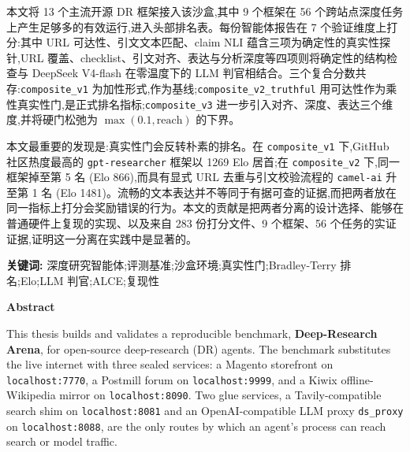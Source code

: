 \documentclass[UTF8,a4paper,12pt,oneside]{ctexart}
\begin{document}
本文将 13 个主流开源 DR 框架接入该沙盒,其中 9 个框架在 56 个跨站点深度任务上产生足够多的有效运行,进入头部排名表。每份智能体报告在 7 个验证维度上打分:其中 URL 可达性、引文文本匹配、claim NLI 蕴含三项为确定性的真实性探针,URL 覆盖、checklist、引文对齐、表达与分析深度等四项则将确定性的结构检查与 DeepSeek V4-flash 在零温度下的 LLM 判官相结合。三个复合分数共存:\texttt{composite\_v1} 为加性形式,作为基线;\texttt{composite\_v2\_truthful} 用可达性作为乘性真实性门,是正式排名指标;\texttt{composite\_v3} 进一步引入对齐、深度、表达三个维度,并将硬门松弛为 \(\max(0.1, \text{reach})\) 的下界。

本文最重要的发现是:真实性门会反转朴素的排名。在 \texttt{composite\_v1} 下,GitHub 社区热度最高的 \texttt{gpt-researcher} 框架以 1269 Elo 居首;在 \texttt{composite\_v2} 下,同一框架掉至第 5 名 (Elo 866),而具有显式 URL 去重与引文校验流程的 \texttt{camel-ai} 升至第 1 名 (Elo 1481)。流畅的文本表达并不等同于有据可查的证据,而把两者放在同一指标上打分会奖励错误的行为。本文的贡献是把两者分离的设计选择、能够在普通硬件上复现的实现、以及来自 283 份打分文件、9 个框架、56 个任务的实证证据,证明这一分离在实践中是显著的。

\vspace{1em}
\noindent\textbf{关键词:} 深度研究智能体;评测基准;沙盒环境;真实性门;Bradley-Terry 排名;Elo;LLM 判官;ALCE;复现性

\clearpage

\begin{center}
{\Large\bfseries Abstract}
\end{center}
\vspace{0.5em}

This thesis builds and validates a reproducible benchmark, \textbf{Deep-Research Arena}, for open-source deep-research (DR) agents. The benchmark substitutes the live internet with three sealed services: a Magento storefront on \texttt{localhost:7770}, a Postmill forum on \texttt{localhost:9999}, and a Kiwix offline-Wikipedia mirror on \texttt{localhost:8090}. Two glue services, a Tavily-compatible search shim on \texttt{localhost:8081} and an OpenAI-compatible LLM proxy \texttt{ds\_proxy} on \texttt{localhost:8088}, are the only routes by which an agent's process can reach search or model traffic.
\end{document}
